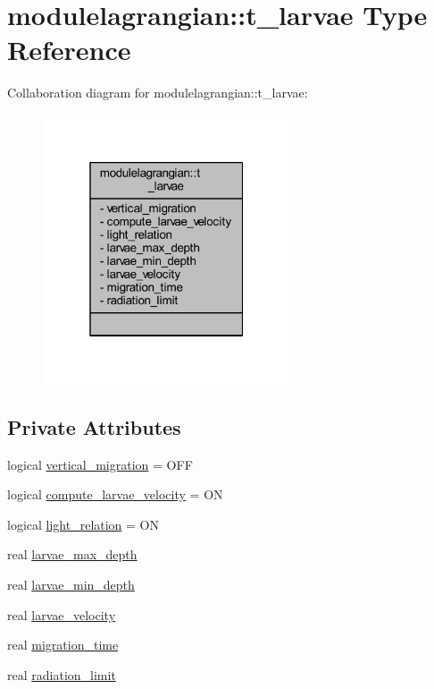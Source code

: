 \hypertarget{structmodulelagrangian_1_1t__larvae}{}\section{modulelagrangian\+:\+:t\+\_\+larvae Type Reference}
\label{structmodulelagrangian_1_1t__larvae}


Collaboration diagram for modulelagrangian\+:\+:t\+\_\+larvae\+:\nopagebreak
\begin{figure}[H]
\begin{center}
\leavevmode
\includegraphics[width=208pt]{structmodulelagrangian_1_1t__larvae__coll__graph}
\end{center}
\end{figure}
\subsection*{Private Attributes}
\begin{DoxyCompactItemize}
\item 
logical \mbox{\hyperlink{structmodulelagrangian_1_1t__larvae_abc29c35728a95f412aa597771f37d6e4}{vertical\+\_\+migration}} = O\+FF
\item 
logical \mbox{\hyperlink{structmodulelagrangian_1_1t__larvae_ad18a4ef9fed6a775e428ab0989348451}{compute\+\_\+larvae\+\_\+velocity}} = ON
\item 
logical \mbox{\hyperlink{structmodulelagrangian_1_1t__larvae_a381078b03d45303c6e26b6bbabdfdfbd}{light\+\_\+relation}} = ON
\item 
real \mbox{\hyperlink{structmodulelagrangian_1_1t__larvae_a265e83c50a6bbbe1e7ad461d72a7d3b2}{larvae\+\_\+max\+\_\+depth}}
\item 
real \mbox{\hyperlink{structmodulelagrangian_1_1t__larvae_aada9c78812c4428f6a35498de9c6c507}{larvae\+\_\+min\+\_\+depth}}
\item 
real \mbox{\hyperlink{structmodulelagrangian_1_1t__larvae_ab20953d4292a750e7cd484ecfe8f6081}{larvae\+\_\+velocity}}
\item 
real \mbox{\hyperlink{structmodulelagrangian_1_1t__larvae_a3bf51259606d7465d10c90e216835966}{migration\+\_\+time}}
\item 
real \mbox{\hyperlink{structmodulelagrangian_1_1t__larvae_a166e7f27e6bb79a4ecce004545e117b5}{radiation\+\_\+limit}}
\end{DoxyCompactItemize}



